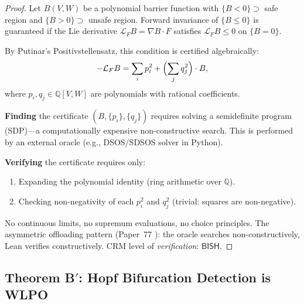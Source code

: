 \documentclass[11pt,a4paper]{article}
\theoremstyle{plain}
\theoremstyle{definition}
\newcommand{\BISH}{\textsf{BISH}}
\newcommand{\Q}{\mathbb{Q}}
\begin{document}
\begin{proof}
Let $B(V,W)$ be a polynomial barrier function with $\{B < 0\} \supset$ safe region and $\{B > 0\} \supset$ unsafe region.  Forward invariance of $\{B \leq 0\}$ is guaranteed if the Lie derivative $\mathcal{L}_F B = \nabla B \cdot F$ satisfies $\mathcal{L}_F B \leq 0$ on $\{B = 0\}$.

By Putinar's Positivstellensatz, this condition is certified algebraically:
\[
  -\mathcal{L}_F B = \sum_i p_i^2 + \Bigl(\sum_j q_j^2\Bigr) \cdot B,
\]
where $p_i, q_j \in \Q[V,W]$ are polynomials with rational coefficients.

\textbf{Finding} the certificate $(B, \{p_i\}, \{q_j\})$ requires solving a semidefinite program (SDP)---a computationally expensive non-constructive search.  This is performed by an external oracle (e.g., DSOS/SDSOS solver in Python).

\textbf{Verifying} the certificate requires only:
\begin{enumerate}[nosep]
\item Expanding the polynomial identity (ring arithmetic over $\Q$).
\item Checking non-negativity of each $p_i^2$ and $q_j^2$ (trivial: squares are non-negative).
\end{enumerate}
No continuous limits, no supremum evaluations, no choice principles.  The asymmetric offloading pattern (Paper~77 \cite{p77}): the oracle searches non-constructively, Lean verifies constructively.  CRM level of \emph{verification}: $\BISH$.
\end{proof}

\subsection{Theorem B$'$: Hopf Bifurcation Detection is WLPO}
\end{document}
